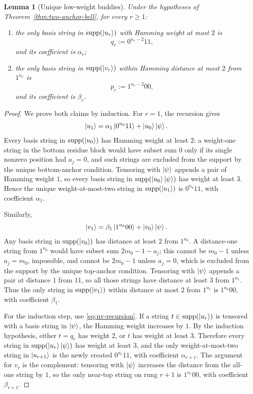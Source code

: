 \documentclass[11pt]{article}
\newcommand{\supp}{\operatorname{supp}}
\newcommand{\ketpsi}{\ket{\psi}}
\newtheorem{lemma}[theorem]{Lemma}
\begin{document}
\begin{lemma}[Unique low-weight buddies]
\label{lem:buddy-unique}
Under the hypotheses of Theorem~\ref{thm:two-anchor-bell}, for every $r\ge1$:
\begin{enumerate}[label=\textup{(\roman*)}]
\item the only basis string in $\supp(\ket{u_r})$ with Hamming weight at most $2$ is
\begin{equation}
  q_r:=0^{n_r-2}11,
  \label{eq:qr-def}
\end{equation}
and its coefficient is $\alpha_r$;
\item the only basis string in $\supp(\ket{v_r})$ within Hamming distance at most $2$ from
$1^{n_r}$ is
\begin{equation}
  p_r:=1^{n_r-2}00,
  \label{eq:pr-def}
\end{equation}
and its coefficient is $\beta_r$.
\end{enumerate}
\end{lemma}

\begin{proof}
We prove both claims by induction.  For $r=1$, the recursion gives
\[
  \ket{u_1}=\alpha_1\ket{0^{n_0}11}+\ket{u_0}\ketpsi.
\]
Every basis string in $\supp(\ket{u_0})$ has Hamming weight at least $2$: a weight-one string in
the bottom residue block would have subset sum $0$ only if its single nonzero position had
$a_j=0$, and such strings are excluded from the support by the unique bottom-anchor condition.
Tensoring with $\ketpsi$ appends a pair of Hamming weight $1$, so every basis string in
$\supp(\ket{u_0}\ketpsi)$ has weight at least $3$.  Hence the unique weight-at-most-two string in
$\supp(\ket{u_1})$ is $0^{n_0}11$, with coefficient $\alpha_1$.

Similarly,
\[
  \ket{v_1}=\beta_1\ket{1^{n_0}00}+\ket{v_0}\ketpsi.
\]
Any basis string in $\supp(\ket{v_0})$ has distance at least $2$ from $1^{n_0}$.  A distance-one
string from $1^{n_0}$ would have subset sum $2m_0-1-a_j$; this cannot be $m_0-1$ unless
$a_j=m_0$, impossible, and cannot be $2m_0-1$ unless $a_j=0$, which is excluded from the support
by the unique top-anchor condition.  Tensoring with $\ketpsi$ appends a pair at distance $1$ from
$11$, so all those strings have distance at least $3$ from $1^{n_1}$.  Thus the only string in
$\supp(\ket{v_1})$ within distance at most $2$ from $1^{n_1}$ is $1^{n_0}00$, with coefficient
$\beta_1$.

For the induction step, use \eqref{eq:uv-recursion}.  If a string $t\in\supp(\ket{u_r})$ is
tensored with a basis string in $\ketpsi$, the Hamming weight increases by $1$.  By the induction
hypothesis, either $t=q_r$ has weight $2$, or $t$ has weight at least $3$.  Therefore every string
in $\supp(\ket{u_r}\ketpsi)$ has weight at least $3$, and the only weight-at-most-two string in
$\ket{u_{r+1}}$ is the newly created $0^{n_r}11$, with coefficient $\alpha_{r+1}$.  The argument
for $v_r$ is the complement: tensoring with $\ketpsi$ increases the distance from the all-one
string by $1$, so the only near-top string on rung $r+1$ is $1^{n_r}00$, with coefficient
$\beta_{r+1}$.
\end{proof}
\end{document}
